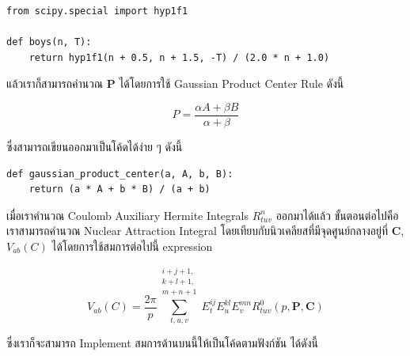 \begin{lstlisting}[style=MyPython]
from scipy.special import hyp1f1

def boys(n, T):
    return hyp1f1(n + 0.5, n + 1.5, -T) / (2.0 * n + 1.0)
\end{lstlisting}

\vspace{5pt}

\noindent แล้วเราก็สามารถคำนวณ $\mathbf{P}$ ได้โดยการใช้ Gaussian Product Center Rule ดังนี้

\begin{equation}
  P
  =
  \frac{\alpha A + \beta B}{\alpha + \beta}
\end{equation}

\noindent ซึ่งสามารถเขียนออกมาเป็นโค้ดได้ง่าย ๆ ดังนี้

\vspace{5pt}

\begin{lstlisting}[style=MyPython]
def gaussian_product_center(a, A, b, B):
    return (a * A + b * B) / (a + b)
\end{lstlisting}

\vspace{5pt}

เมื่อเราคำนวณ Coulomb Auxiliary Hermite Integrals $R^{n}_{tuv}$ ออกมาได้แล้ว ขั้นตอนต่อไปคือเราสามารถคำนวณ Nuclear
Attraction Integral โดยเทียบกับนิวเคลียสที่มีจุดศูนย์กลางอยู่ที่ $\mathbf{C}$, $V_{ab}(C)$ ได้โดยการใช้สมการต่อไปนี้
expression

\begin{equation}
  V_{ab}(C)
  =
  \frac{2\pi}{p}
  \sum\limits_{t,u,v}^{\substack{i+j+1,\\k+l+1,\\m+n+1}}
  E_t^{ij} E_u^{kl} E_v^{mn} R^0_{tuv}(p,\mathbf{P},\mathbf{C})
\end{equation}

\noindent ซึ่งเราก็จะสามารถ Implement สมการด้านบนนี้ให้เป็นโค้ดตามฟังก์ชัน  ได้ดังนี้

\vspace{5pt}

